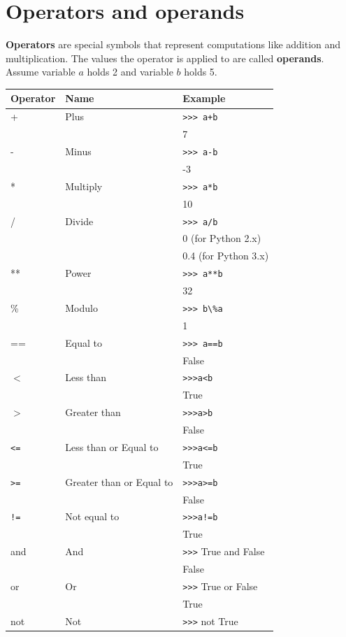 \documentclass[10pt]{book}
\begin{document}
{\section{Operators and operands}
{\bf Operators} are special symbols that represent computations like addition and multiplication.  The values the operator is applied to are called {\bf operands}. Assume variable $a$ holds 2 and variable $b$ holds 5.

\begin{tabular}{lll}
\toprule
Operator & Name & Example \\
\midrule
+ & Plus & \verb">>> a+b" \\
  &      & 7 \\
- & Minus & \verb">>> a-b" \\
  &      & -3 \\
* & Multiply & \verb">>> a*b" \\
  &      & 10 \\
/ & Divide & \verb">>> a/b" \\
  &      & 0 (for Python 2.x) \\
  &      & 0.4 (for Python 3.x) \\
** & Power & \verb">>> a**b" \\
  &      & 32 \\
\% & Modulo & \verb">>> b\%a" \\
  &      & 1 \\
== & Equal to & \verb">>> a==b" \\
  &      & False \\
$<$ & Less than & \verb">>>a<b" \\
  &      & True \\
$>$ & Greater than & \verb">>>a>b" \\
  &      & False \\
\verb"<=" & Less than or Equal to & \verb">>>a<=b" \\
  &      & True \\
\verb">=" & Greater than or Equal to& \verb">>>a>=b" \\
  &      & False \\
\verb"!=" & Not equal to & \verb">>>a!=b" \\
  &      & True \\
and & And & \verb">>>" True and False \\
  &      & False \\
or & Or & \verb">>>" True or False \\
  &      & True \\
not & Not & \verb">>>" not True \\

\end{tabular}}
\end{document}
